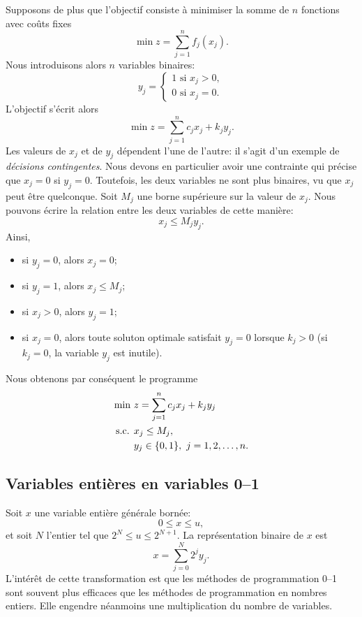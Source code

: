 Supposons de plus que l'objectif consiste à minimiser la somme de $n$ fonctions avec coûts fixes
\[
\min z = \sum_{j=1}^n f_j(x_j).
\]
Nous introduisons alors $n$ variables binaires:
\[
y_j =
\begin{cases}
1 \mbox{ si } x_j > 0,\\
0 \mbox{ si } x_j = 0.
\end{cases}
\]
L'objectif s'écrit alors
\[
\min z = \sum_{j = 1}^n c_jx_j + k_jy_j.
\]
Les valeurs de $x_j$ et de $y_j$ dépendent l'une de l'autre: il s'agit d'un exemple de {\sl décisions contingentes}.
Nous devons en particulier avoir une contrainte qui précise que $x_j = 0$ si $y_j = 0$.
Toutefois, les deux variables ne sont plus binaires, vu que $x_j$ peut être quelconque.
Soit $M_j$ une borne supérieure sur la valeur de $x_j$.
Nous pouvons écrire la relation entre les deux variables de cette manière:
\[
x_j \leq M_jy_j.
\]
Ainsi,
\begin{itemize}
\item
si $y_j = 0$, alors $x_j = 0$;
\item
si $y_j = 1$, alors $x_j \leq M_j$;
\item
si $x_j > 0$, alors $y_j = 1$;
\item
si $x_j = 0$, alors toute soluton optimale satisfait $y_j = 0$ lorsque $k_j > 0$ (si $k_j = 0$, la variable $y_j$ est inutile).
\end{itemize}
Nous obtenons par conséquent le programme
\begin{align*}
\min\ & z = \sum_{j = 1}^n c_jx_j + k_jy_j\\
\mbox{s.c. } & x_j \leq M_j, \\
& y_j \in \lbrace 0,1 \rbrace,\ j = 1,2,\ldots,n.
\end{align*}

\subsection{Variables entières en variables 0--1}

Soit $x$ une variable entière générale bornée:
\[
0 \leq x \leq u,
\]
et soit $N$ l'entier tel que $2^N \leq u \leq 2^{N+1}$.
La représentation binaire de $x$ est
\[
x = \sum_{j = 0}^N 2^j y_j.
\]
L'intérêt de cette transformation est que les méthodes de programmation 0--1 sont souvent plus efficaces que les méthodes de programmation en nombres entiers.
Elle engendre néanmoins une multiplication du nombre de variables.

